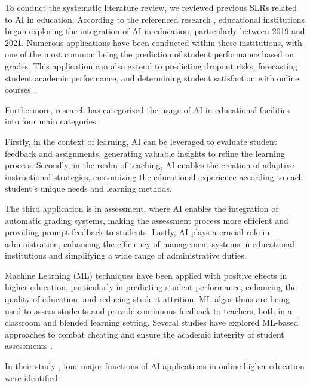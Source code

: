 \documentclass{svproc}
\begin{document}
To conduct the systematic literature review, we reviewed previous SLRs related to AI in education. According to the referenced research \cite{Artificial_intelligence_in_online_higher_education:_A_systematic_review_of_empirical}, educational institutions began exploring the integration of AI in education, particularly between 2019 and 2021. Numerous applications have been conducted within these institutions, with one of the most common being the prediction of student performance based on grades. This application can also extend to predicting dropout risks, forecasting student academic performance, and determining student satisfaction with online courses \cite{Artificial_intelligence_in_online_higher_education:_A_systematic_review_of_empirical} \cite{AI_IN_Education_SLR}.

Furthermore, research has categorized the usage of AI in educational facilities into four main categories \cite{Systematic_literature_review_on_opportunities_challenges_and_future_research_recommendations_of_artificial_intelligence_in_education}:

Firstly, in the context of learning, AI can be leveraged to evaluate student feedback and assignments, generating valuable insights to refine the learning process. Secondly, in the realm of teaching, AI enables the creation of adaptive instructional strategies, customizing the educational experience according to each student's unique needs and learning methods.

The third application is in assessment, where AI enables the integration of automatic grading systems, making the assessment process more efficient and providing prompt feedback to students. Lastly, AI plays a crucial role in administration, enhancing the efficiency of management systems in educational institutions and simplifying a wide range of administrative duties.

Machine Learning (ML) techniques have been applied with positive effects in higher education, particularly in predicting student performance, enhancing the quality of education, and reducing student attrition. ML algorithms are being used to assess students and provide continuous feedback to teachers, both in a classroom and blended learning setting. Several studies have explored ML-based approaches to combat cheating and ensure the academic integrity of student assessments \cite{AI_IN_Education_SLR}.

In their study \cite{Artificial_intelligence_in_online_higher_education:_A_systematic_review_of_empirical}, four major functions of AI applications in online higher education were identified:
\end{document}
